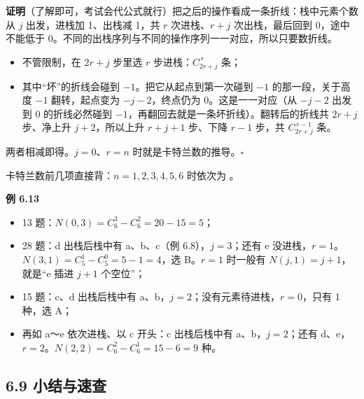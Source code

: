 \documentclass[10.5pt,a4paper,oneside]{article}
\newcommand{\uln}[1]{\CJKunderline[format=\color{wdred},thickness=0.9pt,depth=0.28em]{#1}}
\providecommand{\tightlist}{\setlength{\itemsep}{2pt}\setlength{\parskip}{0pt}}
\begin{document}
\textbf{证明}（了解即可，考试会代公式就行）把之后的操作看成一条折线：栈中元素个数从
\(j\) 出发，进栈加 1、出栈减 1，共 \(r\) 次进栈、\(r+j\)
次出栈，最后回到 0，途中不能低于
0。不同的出栈序列与不同的操作序列一一对应，所以只要数折线。

\begin{itemize}
\tightlist
\item
  不管限制，在 \(2r+j\) 步里选 \(r\) 步进栈：\(C_{2r+j}^{\,r}\) 条；
\item
  其中“坏”的折线会碰到 \(-1\)。把它从起点到第一次碰到 \(-1\)
  的那一段，关于高度 \(-1\) 翻转，起点变为 \(-j-2\)，终点仍为
  0。这是一一对应（从 \(-j-2\) 出发到 0 的折线必然碰到
  \(-1\)，再翻回去就是一条坏折线）。翻转后的折线共 \(2r+j\) 步、净上升
  \(j+2\)，所以上升 \(r+j+1\) 步、下降 \(r-1\) 步，共
  \(C_{2r+j}^{\,r-1}\) 条。
\end{itemize}

两者相减即得。\(j=0\)、\(r=n\) 时就是卡特兰数的推导。\(\square\)

卡特兰数前几项直接背：\(n=1,2,3,4,5,6\) 时依次为
\uln{1, 2, 5, 14, 42, 132}。

\textbf{例 6.13}

\begin{itemize}
\tightlist
\item
  13 题：\(N(0,3)=C_6^3-C_6^2=20-15=5\)；
\item
  28 题：d 出栈后栈中有 a、b、c（例 6.8），\(j=3\)；还有 e
  没进栈，\(r=1\)。\(N(3,1)=C_5^1-C_5^0=5-1=4\)，选 B。\(r=1\) 时一般有
  \(N(j,1)=j+1\)，就是“e 插进 \(j+1\) 个空位”；
\item
  15 题：c、d 出栈后栈中有 a、b，\(j=2\)；没有元素待进栈，\(r=0\)，只有
  1 种，选 A；
\item
  再如 a～e 依次进栈、以 c 开头：c 出栈后栈中有 a、b，\(j=2\)；还有
  d、e，\(r=2\)。\(N(2,2)=C_6^2-C_6^1=15-6=9\) 种。
\end{itemize}

\hypertarget{ux5c0fux7ed3ux4e0eux901fux67e5}{%
\subsection{6.9 小结与速查}\label{ux5c0fux7ed3ux4e0eux901fux67e5}}

\end{document}
